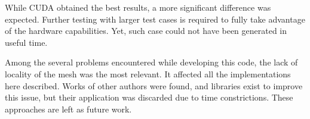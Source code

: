 While CUDA obtained the best results, a more significant difference was expected. Further testing with larger test cases is required to fully take advantage of the hardware capabilities. Yet, such case could not have been generated in useful time.

Among the several problems encountered while developing this code, the lack of locality of the mesh was the most relevant. It affected all the implementations here described. Works of other authors were found, and libraries exist to improve this issue, but their application was discarded due to time constrictions. These approaches are left as future work.
